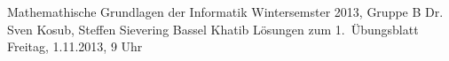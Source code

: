 \documentclass[10pt,a4paper]{article}             %
\begin{document}
    \thispagestyle{ErsteSeite}						  %
    \uebkopfzeile
    {Mathemathische Grundlagen der Informatik}               %
    {Wintersemster 2013, Gruppe B}				  %
    {Dr. Sven Kosub, Steffen Sievering}                      			  %
    {Bassel Khatib}					  %
    \uebtitel
    {Lösungen zum 1.\ Übungsblatt}  			      %
    {Freitag, 1.11.2013, 9 Uhr }    		      %

    \vspace{8mm}								 	  %


    \begin{enumerate}
    \end{enumerate}

    
\end{document}

